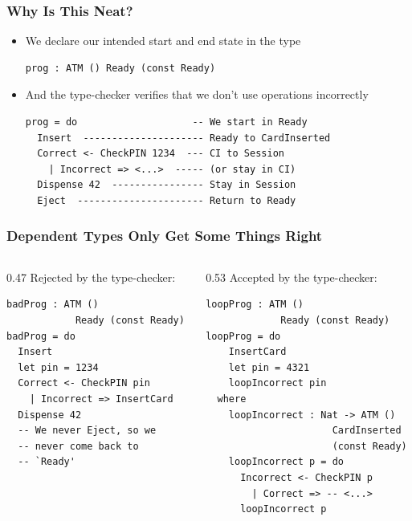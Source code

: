 \documentclass[compress]{beamer}
\begin{document}
\begin{frame}[fragile]
  \frametitle{Why Is This Neat?}

  \large

  \begin{itemize}
    \item<1-> We declare our intended start and end state in the type
              \begin{verbatim}
prog : ATM () Ready (const Ready)
              \end{verbatim}
    \item<2-> And the type-checker verifies that we don't use operations
              incorrectly
              \begin{verbatim}
prog = do                    -- We start in Ready
  Insert  --------------------- Ready to CardInserted
  Correct <- CheckPIN 1234  --- CI to Session
    | Incorrect => <...>  ----- (or stay in CI)
  Dispense 42  ---------------- Stay in Session
  Eject  ---------------------- Return to Ready
              \end{verbatim}
  \end{itemize}

\end{frame}


\begin{frame}[fragile]
  \frametitle{Dependent Types Only Get Some Things Right}

  \begin{columns}
  \begin{column}{0.47\framewidth}
    {\color{red} Rejected by the type-checker:}
    \vspace*{1mm}
    \begin{verbatim}
badProg : ATM ()
            Ready (const Ready)
badProg = do
  Insert
  let pin = 1234
  Correct <- CheckPIN pin
    | Incorrect => InsertCard
  Dispense 42
  -- We never Eject, so we
  -- never come back to
  -- `Ready'
    \end{verbatim}
    \vspace*{2.5mm}
  \end{column}

  \pause  %

  \vrule{}

  \begin{column}{0.53\framewidth}
    {\color{orange} Accepted by the type-checker:}
    \vspace*{1mm}
    \begin{verbatim}
loopProg : ATM ()
             Ready (const Ready)
loopProg = do
    InsertCard
    let pin = 4321
    loopIncorrect pin
  where
    loopIncorrect : Nat -> ATM ()
                      CardInserted
                      (const Ready)
    loopIncorrect p = do
      Incorrect <- CheckPIN p
        | Correct => -- <...>
      loopIncorrect p
    \end{verbatim}
    \vspace*{-6mm}
  \end{column}
  \end{columns}
\end{frame}
\end{document}
